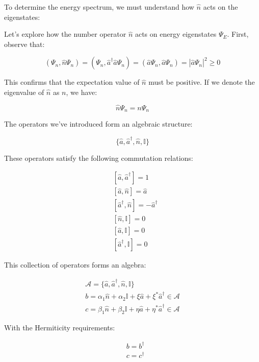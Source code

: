 \documentclass[10pt]{article}
\begin{document}
To determine the energy spectrum, we must understand how $\hat{n}$ acts on the eigenstates:


Let's explore how the number operator $\hat{n}$ acts on energy eigenstates $\Psi_E$. First, observe that:

\begin{equation*}
(\Psi_n, \hat{n}\Psi_n) = (\Psi_n, \hat{a}^\dagger\hat{a}\Psi_n) = (\hat{a}\Psi_n, \hat{a}\Psi_n) = |\hat{a}\Psi_n|^2 \geq 0 \tag{5.14}
\end{equation*}

This confirms that the expectation value of $\hat{n}$ must be positive. If we denote the eigenvalue of $\hat{n}$ as $n$, we have:

\begin{equation*}
\hat{n}\Psi_n = n\Psi_n \tag{5.15}
\end{equation*}

The operators we've introduced form an algebraic structure:

\begin{equation*}
\{\hat{a}, \hat{a}^\dagger, \hat{n}, \mathbb{I}\} \tag{5.16}
\end{equation*}

These operators satisfy the following commutation relations:

\begin{align*}
&[\hat{a}, \hat{a}^\dagger] = 1 \\
&[\hat{a}, \hat{n}] = \hat{a} \\
&[\hat{a}^\dagger, \hat{n}] = -\hat{a}^\dagger \tag{5.17} \\
&[\hat{n}, \mathbb{I}] = 0 \\
&[\hat{a}, \mathbb{I}] = 0 \\
&[\hat{a}^\dagger, \mathbb{I}] = 0
\end{align*}

This collection of operators forms an algebra:

\begin{gather*}
\mathcal{A} = \{\hat{a}, \hat{a}^\dagger, \hat{n}, \mathbb{I}\} \tag{5.18} \\
b = \alpha_1\hat{n} + \alpha_2\mathbb{I} + \xi\hat{a} + \xi^*\hat{a}^\dagger \in \mathcal{A} \\
c = \beta_1\hat{n} + \beta_2\mathbb{I} + \eta\hat{a} + \eta^*\hat{a}^\dagger \in \mathcal{A} \tag{5.19}
\end{gather*}

With the Hermiticity requirements:

\begin{align*}
&b = b^\dagger \\
&c = c^\dagger \tag{5.20}
\end{align*}
\end{document}

